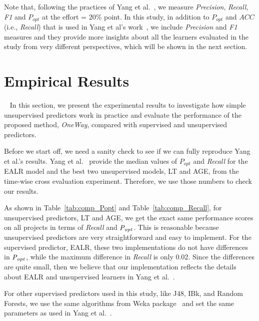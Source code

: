 \documentclass[sigconf]{acmart}
\theoremstyle{break}
\newcommand{\tab}[1]{Table~\ref{tab:#1}}
\begin{document}
Note that, following the practices of Yang et al.~\cite{yang2016effort},
we measure {\it Precision}, {\it Recall}, {\it F1} and $P_{opt}$ at the effort = $20\%$ point. In this study, in addition to $P_{opt}$ and $ACC$ (i.e., {\it Recall}) that is used in Yang et al's work~\cite{yang2016effort}, we include 
{\it Precision} and {\it F1} measures and they provide more insights about all the learners evaluated in the study from very different perspectives, which will be shown in the next section.







\section{Empirical Results}~\label{results}
In this section, we present the experimental results to investigate how
simple unsupervised predictors work in practice and evaluate the performance
of the proposed method, {\it OneWay}, compared with supervised and unsupervised predictors.

Before we start off, we need a sanity check to see if we can fully 
reproduce Yang et al.'s results. Yang et al.~\cite{yang2016effort}
provide the median values of $P_{opt}$ and {\it Recall} for the EALR
model and the best two unsupervised models, LT and AGE, from the
time-wise cross evaluation  experiment. Therefore, we use those numbers to check
our results.



As shown in \tab{comp_Popt} and \tab{comp_Recall}, for unsupervised predictors,
LT and AGE, we get the exact same performance scores on all projects in terms
of {\it Recall} and ${\it P_{opt}}$. This is reasonable because unsupervised predictors
are very straightforward and easy to implement. For the supervised predictor, EALR, 
these two implementations do not have differences in ${\it P_{opt}}$, while the maximum
difference in  {\it Recall} is only ${0.02}$. Since the differences are quite small,
then we believe that our implementation reflects the details about EALR and unsupervised
learners in Yang et al.~\cite{yang2016effort}. 

For other supervised predictors used in this study, like J48, IBk, and  Random Forests,
we use the same algorithms from Weka package~\cite{hall2009weka} and set the same parameters as  used in Yang et al.~\cite{yang2016effort}.
\end{document}
